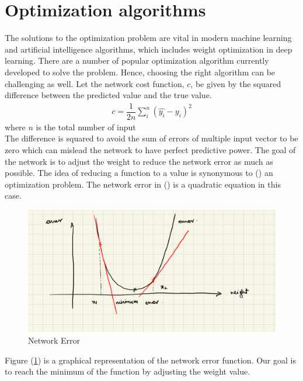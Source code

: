 \section{Optimization algorithms}
The solutions to the optimization problem are vital in modern machine learning and artificial intelligence algorithms, which includes weight optimization in deep learning. There are a number of popular optimization algorithm currently developed to solve the problem. Hence, choosing the right algorithm can be challenging as well.
Let the network cost function, $c$, be given by the squared difference between the predicted value and the true value. 
\begin{align}
   c = \dfrac{1}{2n}\sum^{n}_i (\widehat{y_i}-y_i)^2
  \label{network_error}
\end{align}
where $n$ is the total number of input\\
\indent The difference is squared to avoid the sum of errors of multiple input vector to be zero which can mislead the network to have perfect predictive power. The goal of the network is to adjust the weight to reduce the network error as much as possible. The idea of reducing a function to a value is synonymous to () an optimization problem. The network error in () is a quadratic equation in this case.
\begin{figure}[H]
  \centering
  \includegraphics[scale=0.15]{CHAPTER_2/c2_fig_network_error.jpeg}
  \caption{Network Error}
  \label{network_error_graph}
\end{figure}
\noindent Figure (\ref*{network_error_graph}) is a graphical representation of the network error function. Our goal is to reach the minimum of the function by adjusting the weight value.
